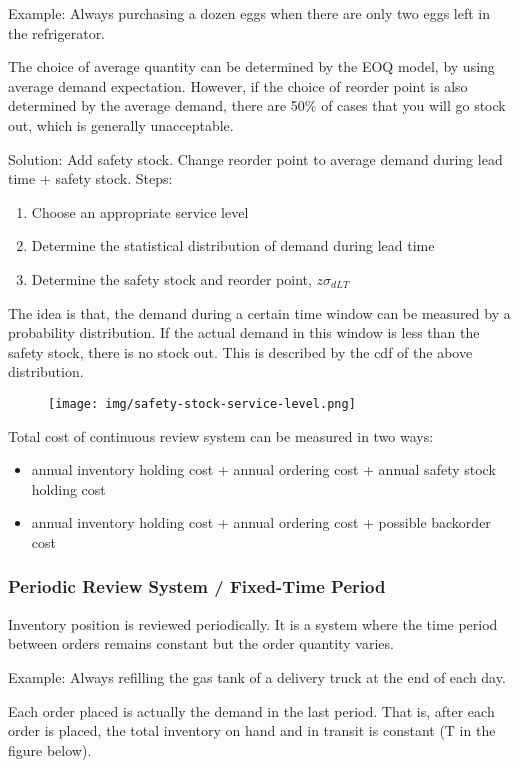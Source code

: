 \documentclass{article}
\begin{document}
Example: Always purchasing a dozen eggs when there are only two eggs left in the refrigerator.

The choice of average quantity can be determined by the EOQ model, by using average demand expectation.
However, if the choice of reorder point is also determined by the average demand,
there are 50\% of cases that you will go stock out, which is generally unacceptable.

Solution: Add safety stock. Change reorder point to average demand during lead time + safety stock.
Steps:
\begin{enumerate}
	\item Choose an appropriate service level
	\item Determine the statistical distribution of demand during lead time
	\item Determine the safety stock and reorder point, $z \sigma_{dLT}$
\end{enumerate}

The idea is that, the demand during a certain time window can be measured by a probability distribution.
If the actual demand in this window is less than the safety stock, there is no stock out.
This is described by the cdf of the above distribution.

\begin{figure}[H]
	\centering
	\texttt{[image: img/safety-stock-service-level.png]}
\end{figure}

Total cost of continuous review system can be measured in two ways:
\begin{itemize}
	\item annual inventory holding cost + annual ordering cost + annual safety stock holding cost
	\item annual inventory holding cost + annual ordering cost + possible backorder cost
\end{itemize}

\subsubsection{Periodic Review System / Fixed-Time Period}

Inventory position is reviewed periodically.
It is a system where the time period between orders remains constant but the order quantity varies.

Example: Always refilling the gas tank of a delivery truck at the end of each day.

Each order placed is actually the demand in the last period.
That is, after each order is placed,
the total inventory on hand and in transit is constant (T in the figure below).
\end{document}
